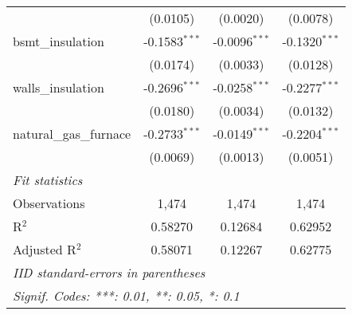 \begin{tabular}{lccc}
                           & (0.0105)                                                                 & (0.0020)                                                                    & (0.0078)\\
   bsmt\_insulation       & -0.1583$^{***}$                                                          & -0.0096$^{***}$                                                             & -0.1320$^{***}$\\
                           & (0.0174)                                                                 & (0.0033)                                                                    & (0.0128)\\
   walls\_insulation      & -0.2696$^{***}$                                                          & -0.0258$^{***}$                                                             & -0.2277$^{***}$\\
                           & (0.0180)                                                                 & (0.0034)                                                                    & (0.0132)\\
   natural\_gas\_furnace & -0.2733$^{***}$                                                          & -0.0149$^{***}$                                                             & -0.2204$^{***}$\\
                           & (0.0069)                                                                 & (0.0013)                                                                    & (0.0051)\\
   \midrule \emph{Fit statistics} &   &   &  \\
   Observations            & 1,474                                                                    & 1,474                                                                       & 1,474\\
   R$^2$                   & 0.58270                                                                  & 0.12684                                                                     & 0.62952\\
   Adjusted R$^2$          & 0.58071                                                                  & 0.12267                                                                     & 0.62775\\
   \midrule\midrule\multicolumn{4}{l}{\emph{IID standard-errors in parentheses}}\\
   \multicolumn{4}{l}{\emph{Signif. Codes: ***: 0.01, **: 0.05, *: 0.1}}\\
\end{tabular}


